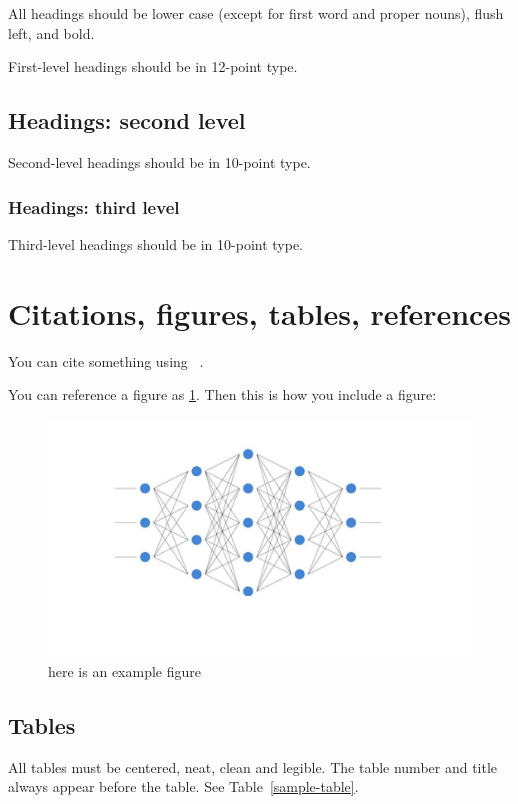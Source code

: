 \documentclass{article}
\begin{document}
All headings should be lower case (except for first word and proper nouns),
flush left, and bold.

First-level headings should be in 12-point type.

\subsection{Headings: second level}

Second-level headings should be in 10-point type.

\subsubsection{Headings: third level}

Third-level headings should be in 10-point type.

\section{Citations, figures, tables, references}
\label{others}

You can cite something using ~\cite{Lecun15}. 

You can reference a figure as \ref{example_figure_label}. Then this is how you include a figure:

\begin{figure}
\centering
\includegraphics[width=0.8\linewidth]{example_figure.pdf}
\caption{here is an example figure }
\label{example_figure_label}
\end{figure}


\subsection{Tables}

All tables must be centered, neat, clean and legible.  The table number and
title always appear before the table.  See Table~\ref{sample-table}.
\end{document}
